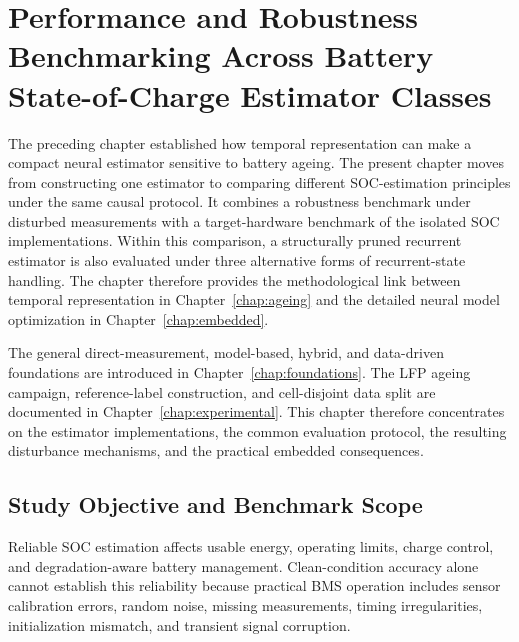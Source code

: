 \chapter{Performance and Robustness Benchmarking Across Battery State-of-Charge Estimator Classes}
\label{chap:robustness}

The preceding chapter established how temporal representation can make a compact neural estimator sensitive to battery ageing. The present chapter moves from constructing one estimator to comparing different SOC-estimation principles under the same causal protocol. It combines a robustness benchmark under disturbed measurements with a target-hardware benchmark of the isolated SOC implementations. Within this comparison, a structurally pruned recurrent estimator is also evaluated under three alternative forms of recurrent-state handling. The chapter therefore provides the methodological link between temporal representation in Chapter~\ref{chap:ageing} and the detailed neural model optimization in Chapter~\ref{chap:embedded}.

The general direct-measurement, model-based, hybrid, and data-driven foundations are introduced in Chapter~\ref{chap:foundations}. The LFP ageing campaign, reference-label construction, and cell-disjoint data split are documented in Chapter~\ref{chap:experimental}. This chapter therefore concentrates on the estimator implementations, the common evaluation protocol, the resulting disturbance mechanisms, and the practical embedded consequences.

\section{Study Objective and Benchmark Scope}
\label{sec:robustness_objective}

Reliable SOC estimation affects usable energy, operating limits, charge control, and degradation-aware battery management. Clean-condition accuracy alone cannot establish this reliability because practical BMS operation includes sensor calibration errors, random noise, missing measurements, timing irregularities, initialization mismatch, and transient signal corruption.\autocite{shrivastavaReviewTechnologicalAdvancement2023,guoSystematicReviewElectrochemical2024,yaoSmarterBatteryManagement2025b,liRobustnessSOCEstimation2015,naseriReliableWirelessBMS2025,bergerBenchmarkingBatteryManagement2024}

